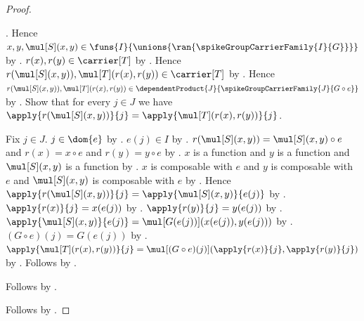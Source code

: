 \begin{proof}
\begin{subproof}
            .
        Hence $x,y,\mul[S](x,y)\in\funs{I}{
            \unions{\ran{\spikeGroupCarrierFamily{I}{G}}}}$ by
            .
        $r(x),r(y)\in\carrier[T]$ by .
        Hence $r(\mul[S](x,y)),\mul[T](r(x),r(y))\in\carrier[T]$ by
            .
        Hence
            $r(\mul[S](x,y)),\mul[T](r(x),r(y))\in
                \dependentProduct
                    {J}{\spikeGroupCarrierFamily{J}{G\circ e}}$ by
            .
        Show that for every $j\in J$ we have
            $\apply{r(\mul[S](x,y))}{j}
                =\apply{\mul[T](r(x),r(y))}{j}$.
        \begin{subproof}
            Fix $j\in J$.
            $j\in\dom{e}$ by .
            $e(j)\in I$ by .
            $r(\mul[S](x,y))=\mul[S](x,y)\circ e$ and
                $r(x)=x\circ e$ and $r(y)=y\circ e$ by
                .
            $x$ is a function and $y$ is a function and
                $\mul[S](x,y)$ is a function by
                .
            $x$ is composable with $e$ and $y$ is composable with $e$
                and $\mul[S](x,y)$ is composable with $e$ by
                .
            Hence
                $\apply{r(\mul[S](x,y))}{j}
                    =\apply{\mul[S](x,y)}{e(j)}$ by
                .
            $\apply{r(x)}{j}=x(e(j))$ by .
            $\apply{r(y)}{j}=y(e(j))$ by .
            $\apply{\mul[S](x,y)}{e(j)}
                =\mul[G(e(j))](x(e(j)),y(e(j)))$ by
                .
            $(G\circ e)(j)=G(e(j))$ by
                .
            $\apply{\mul[T](r(x),r(y))}{j}
                =\mul[(G\circ e)(j)]
                    (\apply{r(x)}{j},\apply{r(y)}{j})$ by
                .
            Follows by \auto.
        \end{subproof}
        Follows by .
    \end{subproof}
    Follows by .
\end{proof}

